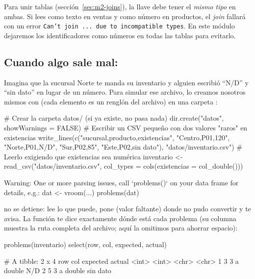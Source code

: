 \begin{advertencia}
Para unir tablas (sección~\ref{sec:m2-joins}), la llave debe tener el
\emph{mismo tipo} en ambas. Si lees  como texto en
ventas y como número en productos, el \emph{join} fallará con un error
\texttt{Can't join ... due to incompatible types}. En este módulo dejaremos
los identificadores como números en todas las tablas para evitarlo.
\end{advertencia}

\subsection{Cuando algo sale mal: \texorpdfstring{}{problems()}}

Imagina que la sucursal Norte te manda su inventario y alguien escribió
``N/D'' y ``sin dato'' en lugar de un número. Para simular ese archivo, lo
creamos nosotros mismos con  (cada elemento es un
renglón del archivo) en una carpeta :

\begin{rcode}
# Crear la carpeta datos/ (si ya existe, no pasa nada)
dir.create("datos", showWarnings = FALSE)
# Escribir un CSV pequeño con dos valores "raros" en existencias
write_lines(c("sucursal,producto,existencias",
              "Centro,P01,120",
              "Norte,P01,N/D",
              "Sur,P02,85",
              "Este,P02,sin dato"),
            "datos/inventario.csv")
# Leerlo exigiendo que existencias sea numérica
inventario <- read_csv("datos/inventario.csv",
                       col_types = cols(existencias = col_double()))
\end{rcode}
\begin{rsalida}
Warning: One or more parsing issues, call `problems()` on your data frame for
details, e.g.:
  dat <- vroom(...)
  problems(dat)
\end{rsalida}

 no se detiene: lee lo que puede, pone  (valor
faltante) donde no pudo convertir y te avisa. La función 
te dice exactamente dónde está cada problema (su columna 
muestra la ruta completa del archivo; aquí la omitimos para ahorrar espacio):

\begin{rcode}
problems(inventario) %
  select(row, col, expected, actual)
\end{rcode}
\begin{rsalida}
# A tibble: 2 x 4
    row   col expected actual  
  <int> <int> <chr>    <chr>   
1     3     3 a double N/D     
2     5     3 a double sin dato
\end{rsalida}

